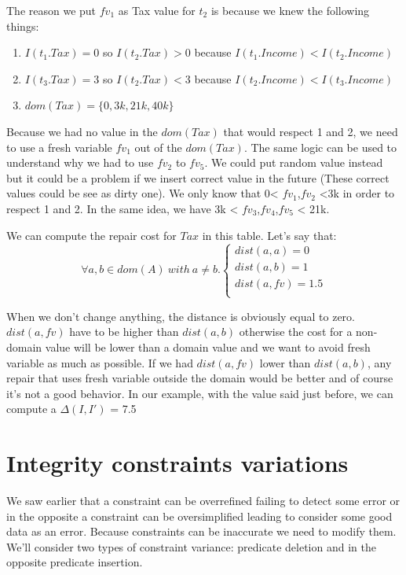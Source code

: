 \documentclass[letterpaper, 12pt]{report}
\begin{document}
The reason we put $fv_1$ as Tax value for $t_2$ is because we knew the following things:
\begin{enumerate}

\item $I(t_1.Tax)=0$ so $I(t_2.Tax)>0$ because $I(t_1.Income)<I(t_2.Income)$
\item $I(t_3.Tax)=3$ so $I(t_2.Tax)<3$ because $I(t_2.Income)<I(t_3.Income)$
\item $dom(Tax) = \{0,3k,21k,40k\}$

\end{enumerate}
Because we had no value in the $dom(Tax)$ that would respect 1 and 2, we need to use a fresh variable $fv_1$ out of the $dom(Tax)$. The same  logic can be used to understand why we had to use $fv_2$ to $fv_5$. We could put random value instead but it could be a problem if we insert correct value in the future (These correct values could be see as dirty one).
We only know that 0< $fv_1$,$fv_2$ <3k in order to respect 1 and 2. In the same idea, we have 3k < $fv_3$,$fv_4$,$fv_5$ < 21k.

We can compute the repair cost for $Tax$ in this table. Let's say that:\\

$$
\forall a,b \in dom(A) \ with \ a \neq b.
\left\{
	\begin{array}{ll}
	   dist(a,a)=0\\
	   dist(a,b)=1\\
	   dist(a,fv)=1.5\\
	\end{array}
\right.
$$

When we don't change anything, the distance is obviously equal to zero. $dist(a,fv)$ have to be higher than $dist(a,b)$ otherwise the cost for a non-domain value will be lower than a domain value and we want to avoid fresh variable as much as possible. If we had $dist(a,fv)$ lower than $dist(a,b)$, any repair that uses fresh variable outside the domain would be better and of course it's not a good behavior. In our example, with the value said just before, we can compute a $\Delta(I,I')$ = 7.5

\section{Integrity constraints variations}

We saw earlier that a constraint can be overrefined failing to detect some error or in the opposite a constraint can be oversimplified leading to consider some good data as an error. Because constraints can be inaccurate we need to modify them. We'll consider two types of constraint variance: predicate deletion and in the opposite predicate insertion.\\
\end{document}
